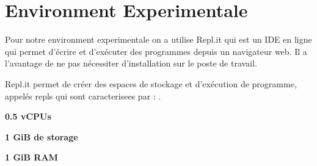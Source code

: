 \chapter{Environment Experimentale}
Pour notre environment experimentale on a utilise Repl.it qui est un IDE en ligne qui permet d'écrire et d'exécuter des programmes depuis un navigateur web. Il a l'avantage de ne pas nécessiter d'installation sur le poste de travail.
\par
Repl.it permet de créer des espaces de stockage et d'exécution de programme, appelés repls qui sont caracterisees par : .
\par
\textbf{0.5 vCPUs}
\par
\textbf{1 GiB de storage}
\par
\textbf{1 GiB RAM}
